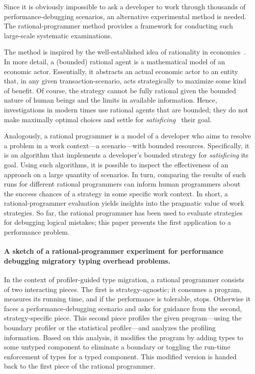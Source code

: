 Since it is obviously impossible to ask a developer to work through thousands of
performance-debugging scenarios, an alternative experimental method is needed.
The rational-programmer method provides a framework for conducting such
large-scale systematic examinations.

The method is inspired by the well-established idea of rationality in
economics~\cite{mill1874essays, henrich2001search}.  In more detail, a (bounded)
rational agent is a mathematical model of an economic actor. Essentially, it
abstracts an actual economic actor to an entity that, in any given
transaction-scenario, acts strategically to maximize some kind of benefit.  Of
course, the strategy cannot be fully rational given the bounded nature of human
beings and the limits in available information. Hence, investigations in modern
times use rational agents that are bounded; they do not make maximally optimal
choices and settle for \emph{satisficing}~\cite{hs:satisfice} their goal.

Analogously, a rational programmer is a model of a developer who aims to resolve
a problem in a work context---a scenario---with bounded
resources. Specifically, it is an algorithm that implements a developer's
bounded strategy for \emph{satisficing} its goal. Using such algorithms, it is
possible to inspect the effectiveness of an approach on a large quantity of
scenarios. In turn, comparing the results of such runs for different rational
programmers can inform human programmers about the success chances of a strategy
in some specific work context. In short, a rational-programmer evaluation yields
insights into the pragmatic value of work strategies. So far, the rational
programmer has been used to evaluate strategies for debugging logical mistakes;
this paper presents the first application to a performance problem. 

\medskip

\paragraph{A sketch of a rational-programmer experiment for performance
debugging migratory typing overhead problems.}  In the context of profiler-guided
type migration, a rational programmer consists of two interacting pieces.  The
first is strategy-agnostic; it consumes a program, measures its running time,
and if the performance is tolerable, stops. Otherwise it faces a
performance-debugging scenario and asks for guidance from the second,
strategy-specific piece. This second piece profiles the given program---using
the boundary profiler or the statistical profiler---and analyzes the
profiling information. Based on this analysis, it modifies the program by adding
types to some untyped component to eliminate a boundary or toggling the run-time
enforcement of types for a typed component. This modified version is handed back
to the first piece of the rational programmer. 

